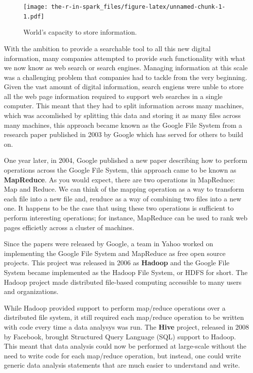\documentclass[]{book}
\theoremstyle{definition}
\theoremstyle{definition}
\theoremstyle{definition}
\theoremstyle{remark}
\begin{document}
\begin{figure}
\centering
\texttt{[image: the-r-in-spark\_files/figure-latex/unnamed-chunk-1-1.pdf]}
\caption{\label{fig:unnamed-chunk-1}World's capacity to store information.}
\end{figure}

With the ambition to provide a searchable tool to all this new digital
information, many companies attempted to provide such functionality with
what we now know as web search or search engines. Managing information
at this scale was a challenging problem that companies had to tackle
from the very beginning. Given the vast amount of digital information,
search engiens were unble to store all the web page information required
to support web searches in a single computer. This meant that they had
to split information across many machines, which was accomlished by
splitting this data and storing it as many files across many machines,
this approach became known as the Google File System from a research
paper published in 2003 by Google which has served for others to build
on.

One year later, in 2004, Google published a new paper describing how to
perform operations across the Google File System, this approach came to
be known as \textbf{MapReduce}. As you would expect, there are two
operations in MapReduce: Map and Reduce. We can think of the mapping
operation as a way to transform each file into a new file and, reuduce
as a way of combining two files into a new one. It happens to be the
case that using these two operations is sufficient to perform
interesting operations; for instance, MapReduce can be used to rank web
pages efficietly across a cluster of machines.

Since the papers were released by Google, a team in Yahoo worked on
implementing the Google File System and MapReduce as free open source
projects. This project was released in 2006 as \textbf{Hadoop} and the
Google File System became implemented as the Hadoop File System, or HDFS
for short. The Hadoop project made distributed file-based computing
accessible to many users and organizations.

While Hadoop provided support to perform map/reduce operations over a
distributed file system, it still required each map/reduce operation to
be written with code every time a data analysys was run. The
\textbf{Hive} project, released in 2008 by Facebook, brought Structured
Query Language (SQL) support to Hadoop. This meant that data analysis
could now be performed at large-scale without the need to write code for
each map/reduce operation, but instead, one could write generic data
analysis statements that are much easier to understand and write.
\end{document}
